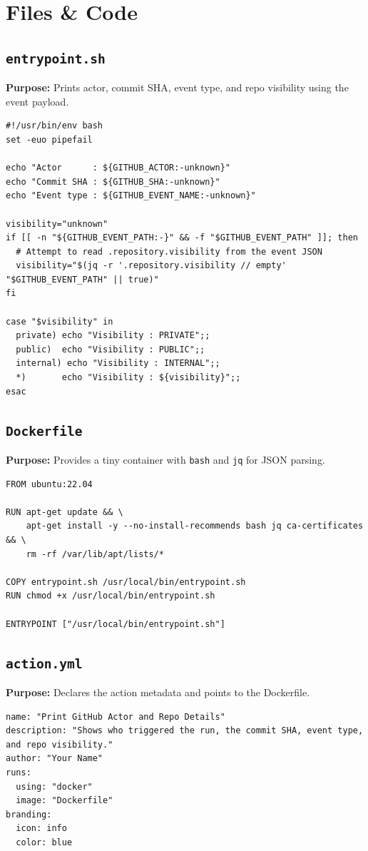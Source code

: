 \documentclass[11pt]{article}
\begin{document}
\section{Files \& Code}

\subsection{\texttt{entrypoint.sh}}
\begin{tcolorbox}
\textbf{Purpose:} Prints actor, commit SHA, event type, and repo visibility using the event payload.
\end{tcolorbox}
\begin{verbatim}
#!/usr/bin/env bash
set -euo pipefail

echo "Actor      : ${GITHUB_ACTOR:-unknown}"
echo "Commit SHA : ${GITHUB_SHA:-unknown}"
echo "Event type : ${GITHUB_EVENT_NAME:-unknown}"

visibility="unknown"
if [[ -n "${GITHUB_EVENT_PATH:-}" && -f "$GITHUB_EVENT_PATH" ]]; then
  # Attempt to read .repository.visibility from the event JSON
  visibility="$(jq -r '.repository.visibility // empty' "$GITHUB_EVENT_PATH" || true)"
fi

case "$visibility" in
  private) echo "Visibility : PRIVATE";;
  public)  echo "Visibility : PUBLIC";;
  internal) echo "Visibility : INTERNAL";;
  *)       echo "Visibility : ${visibility}";;
esac
\end{verbatim}

\subsection{\texttt{Dockerfile}}
\begin{tcolorbox}
\textbf{Purpose:} Provides a tiny container with \texttt{bash} and \texttt{jq} for JSON parsing.
\end{tcolorbox}
\begin{verbatim}
FROM ubuntu:22.04

RUN apt-get update && \
    apt-get install -y --no-install-recommends bash jq ca-certificates && \
    rm -rf /var/lib/apt/lists/*

COPY entrypoint.sh /usr/local/bin/entrypoint.sh
RUN chmod +x /usr/local/bin/entrypoint.sh

ENTRYPOINT ["/usr/local/bin/entrypoint.sh"]
\end{verbatim}
\clearpage

\subsection{\texttt{action.yml}}
\begin{tcolorbox}
\textbf{Purpose:} Declares the action metadata and points to the Dockerfile.
\end{tcolorbox}
\begin{verbatim}
name: "Print GitHub Actor and Repo Details"
description: "Shows who triggered the run, the commit SHA, event type, and repo visibility."
author: "Your Name"
runs:
  using: "docker"
  image: "Dockerfile"
branding:
  icon: info
  color: blue
\end{verbatim}
\end{document}
